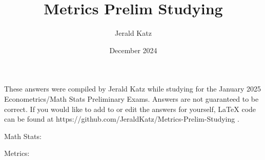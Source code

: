 \documentclass{article}
\title{Metrics Prelim Studying}
\author{Jerald Katz}
\date{December 2024}
\begin{document}
\maketitle
These answers were compiled by Jerald Katz while studying for the January 2025 Econometrics/Math Stats Preliminary Exams.  Answers are not guaranteed to be correct.  If you would like to add to or edit the answers for yourself, \LaTeX{} code can be found at https://github.com/JeraldKatz/Metrics-Prelim-Studying .

Math Stats:










Metrics:



\end{document}
